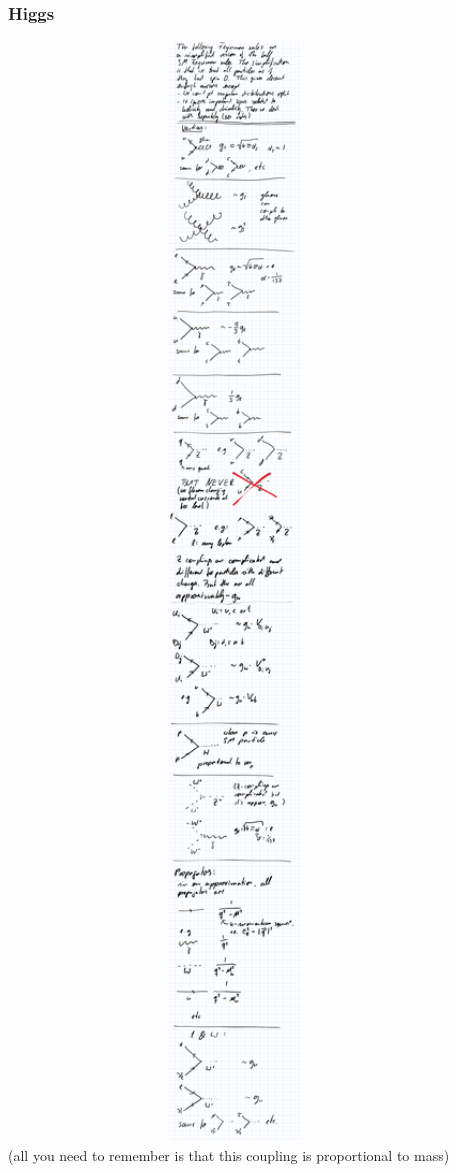 \subsubsection{Higgs}
\includegraphics[width=0.9\textwidth]{fig/summary/F_H}\\
(all you need to remember is that this coupling is proportional to mass)


